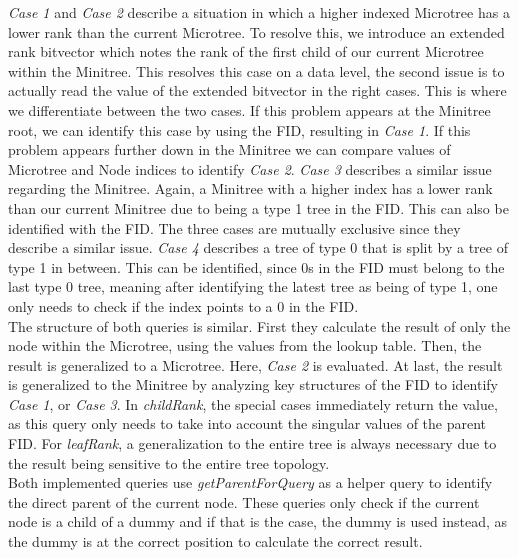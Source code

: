 \documentclass{article}
\begin{document}
\textit{Case 1} and \textit{Case 2} describe a situation in which a higher indexed Microtree has a lower rank than the current Microtree. To resolve this, we introduce an extended rank bitvector which notes the rank of the first child of our current Microtree within the Minitree. This resolves this case on a data level, the second issue is to actually read the value of the extended bitvector in the right cases. This is where we differentiate between the two cases. If this problem appears at the Minitree root, we can identify this case by using the FID, resulting in \textit{Case 1}. If this problem appears further down in the Minitree we can compare values of Microtree and Node indices to identify \textit{Case 2}. \textit{Case 3} describes a similar issue regarding the Minitree. Again, a Minitree with a higher index has a lower rank than our current Minitree due to being a type 1 tree in the FID. This can also be identified with the FID. The three cases are mutually exclusive since they describe a similar issue.
\textit{Case 4} describes a tree of type 0 that is split by a tree of type 1 in between. This can be identified, since 0s in the FID must belong to the last type 0 tree, meaning after identifying the latest tree as being of type 1, one only needs to check if the index points to a 0 in the FID.\\
The structure of both queries is similar. First they calculate the result of only the node within the Microtree, using the values from the lookup table. Then, the result is generalized to a Microtree. Here, \textit{Case 2} is evaluated. At last, the result is generalized to the Minitree by analyzing key structures of the FID to identify \textit{Case 1}, or \textit{Case 3}. In \textit{childRank}, the special cases immediately return the value, as this query only needs to take into account the singular values of the parent FID. For \textit{leafRank}, a generalization to the entire tree is always necessary due to the result being sensitive to the entire tree topology.\\
Both implemented queries use \textit{getParentForQuery} as a helper query to identify the direct parent of the current node. These queries only check if the current node is a child of a dummy and if that is the case, the dummy is used instead, as the dummy is at the correct position to calculate the correct result.\\
\end{document}
